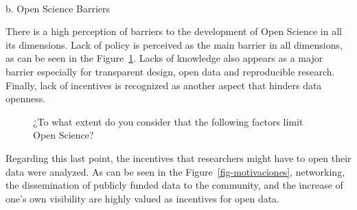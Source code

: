 \documentclass[
  letterpaper,
]{article}
\makeatletter
\let\oldparagraph\paragraph
\renewcommand{\paragraph}{
    \@ifstar
      \xxxParagraphStar
      \xxxParagraphNoStar
  }
\newcommand{\xxxParagraphStar}[1]{\oldparagraph*{#1}\mbox{}}
\newcommand{\xxxParagraphNoStar}[1]{\oldparagraph{#1}\mbox{}}
\makeatother
\begin{document}
\paragraph{b. Open Science Barriers}\label{b.-open-science-barriers}

There is a high perception of barriers to the development of Open
Science in all its dimensions. Lack of policy is perceived as the main
barrier in all dimensions, as can be seen in the
Figure~\ref{fig-barreras}. Lacks of knowledge also appears as a major
barrier especially for transparent design, open data and reproducible
research. Finally, lack of incentives is recognized as another aspect
that hinders data openness.

\begin{figure}


\caption{\label{fig-barreras}¿To what extent do you consider that the
following factors limit Open Science?}

\end{figure}%

Regarding this last point, the incentives that researchers might have to
open their data were analyzed. As can be seen in the
Figure~\ref{fig-motivaciones}, networking, the dissemination of publicly
funded data to the community, and the increase of one's own visibility
are highly valued as incentives for open data.
\end{document}
